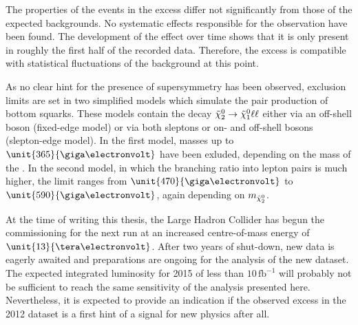The properties of the events in the excess differ not significantly from those of the expected backgrounds. No systematic effects responsible for the observation have been found. The development of the effect over time shows that it is only present in roughly the first half of the recorded data. Therefore, the excess is compatible with statistical fluctuations of the background at this point.

As no clear hint for the presence of supersymmetry has been observed, exclusion limits are set in two simplified models which simulate the pair production of bottom squarks. These models contain the decay ${\tilde{\chi}^0_2} \rightarrow {\tilde{\chi}^0_1} \ell\ell$ either via an off-shell \Z boson (fixed-edge model) or via both sleptons or on- and off-shell \Z bosons (slepton-edge model). In the first model, \sbottom masses up to $\unit{365}{\giga\electronvolt}$ have been exluded, depending on the mass of the \secondchi. In the second model, in which the branching ratio into lepton pairs is much higher, the limit ranges from $\unit{470}{\giga\electronvolt}$ to $\unit{590}{\giga\electronvolt}$, again depending on $m_{{\tilde{\chi}^0_2}}$. 

At the time of writing this thesis, the Large Hadron Collider has begun the commissioning for the next run at  an increased centre-of-mass energy of $\unit{13}{\tera\electronvolt}$. After two years of shut-down, new data is eagerly awaited and preparations are ongoing for the analysis of the new dataset. The expected integrated luminosity for 2015 of less than $10\,\mathrm{fb}^{-1}$ will probably not be sufficient to reach the same sensitivity of the analysis presented here. Nevertheless, it is expected to provide an indication if the observed excess in the 2012 dataset is a first hint of a signal for new physics after all. 